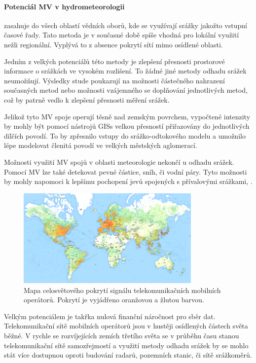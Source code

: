 \documentclass[a4paper,12pt,oneside]{report}
\begin{document}
\paragraph*{Potenciál MV v hydrometeorologii} zasahuje do všech
oblastí vědních oborů, kde se využívají srážky jakožto vstupní časové
řady. Tato metoda je v současné době spíše vhodná pro lokální využití
nežli regionální. Vyplývá to z absence pokrytí sítí mimo osídlené
oblasti.

Jedním z velkých potenciálů této metody je zlepšení přesnosti
prostorové informace o srážkách ve vysokém rozlišení. To žádné jiné
metody odhadu srážek neumožňují. Výsledky stude \cite{mv2} poukazují na
možnosti částečného nahrazení současných metod nebo možnosti
vzájemného se doplňování jednotlivých metod, což by patrně vedlo k
zlepšení přesnosti měření srážek.

Jelikož tyto MV spoje operují těsně nad zemským povrchem, vypočtené
intenzity by mohly být pomocí nástrojů    \acs{GIS}s velkou přesností
přiřazovány do jednotlivých dílčích povodí. To by zpřesnilo vstupy do
srážko-odtokového modelu a umožnilo lépe modelovat členitá povodí ve velkých městských aglomerací.

Možnosti využití MV spojů v oblasti meteorologie nekončí u odhadu
srážek. Pomocí MV lze také detekovat pevné částice, sníh, či vodní
páry. Tyto možnosti by mohly napomoci k lepšímu pochopení jevů
spojených s přívalovými srážkami, \cite{mv2}.
\begin{figure}[h!]
    \centering
    \includegraphics[width=0.8\textwidth]{./img/srazky/opensignalmap.png}
    \caption[Porytí tel. sítí]{\centering Mapa celosvětového pokrytí signálu telekomunikačních mobilních operátorů. Pokrytí je vyjádřeno oranžovou a žlutou barvou. \footnotemark }
 \end{figure}   

Velkým potenciálem je takřka nulová finanční náročnost pro sběr
dat. Telekomunikační sítě mobilních operátorů jsou v hustěji
osídlených částech světa běžné. V rychle se rozvíjejících zemích
třetího světa se v průběhu času stanou telekomunikační sítě
samozřejmostí a využití metody odhadu srážek by se mohlo stát více
dostupnou oproti budování radarů, pozemních stanic, či sítě
srážkoměrů.
 
\end{document}
